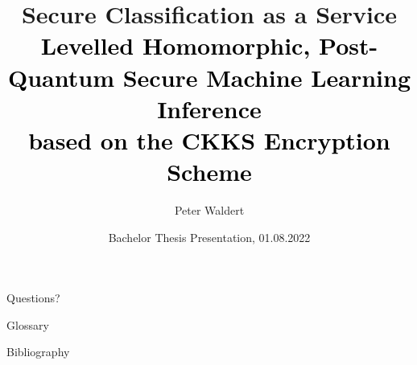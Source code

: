 \documentclass[aspectratio=169, onlytextwidth]{beamer}
\title[Secure Classification as a Service]{
  Secure Classification as a Service \\
  \small\normalfont\textcolor{black}{
    Levelled Homomorphic, Post-Quantum Secure Machine Learning Inference \\
    based on the CKKS Encryption Scheme
  }
}
\author{Peter Waldert}
\date{Bachelor Thesis Presentation, 01.08.2022}
\institute{IAIK}
\begin{document}
  \begin{frame}[plain]
    \maketitle
  \end{frame}

  
  
  
  
  
  
  

  \section*{}
  \begin{frame}[c]
    \centering
    \Large Questions?
  \end{frame}

  \begin{frame}[allowframebreaks]{Glossary}
    \printnoidxglossary[type=acronym]
  \end{frame}

  \begin{frame}[allowframebreaks]{Bibliography}
    \printbibliography
  \end{frame}

  
\end{document}
